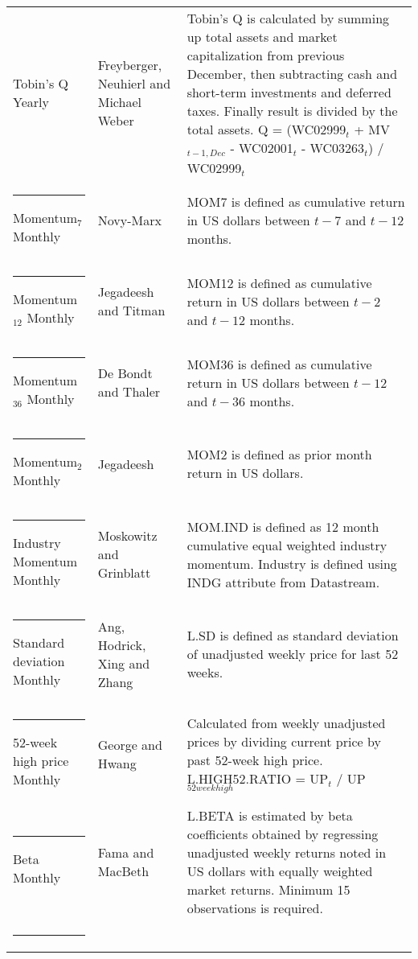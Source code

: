 \documentclass{article}
\begin{document}
{{\begin{xltabular}{\textwidth}{ >{\raggedright\arraybackslash}p{0.23\textwidth} >{\raggedright\arraybackslash}p{0.2\textwidth} X}
Tobin's Q 	\newline Yearly			& Freyberger, Neuhierl and Michael Weber \citeyear{	Freyberger2020} & Tobin's Q is calculated by summing up total assets and market capitalization from previous December, then subtracting cash and short-term investments and deferred taxes. Finally result is divided by the total assets. \newline Q = (WC02999$_{t}$ + MV$_{t-1, Dec}$ - WC02001$_{t}$ - WC03263$_{t}$) / WC02999$_{t}$ \\ \rule{-1ex}{3ex}
Momentum$_{7}$ \newline Monthly	& Novy-Marx \citeyear{NOVYMARX2012}			& MOM7 is defined as cumulative return in US dollars between $t-7$ and $t-12$ months.\\ \rule{-1ex}{3ex}
Momentum$_{12}$ \newline Monthly	& Jegadeesh and Titman \citeyear{Jegadeesh1993}	& MOM12 is defined as cumulative return in US dollars between $t-2$ and $t-12$ months.\\ \rule{-1ex}{3ex}
Momentum$_{36}$ \newline Monthly	& De Bondt and Thaler \citeyear{DeBondt1985}		& MOM36 is defined as cumulative return in US dollars between $t-12$ and $t-36$ months.\\ \rule{-1ex}{3ex}
Momentum$_{2}$ \newline Monthly	& Jegadeesh \citeyear{Jegadeesh1990}			& MOM2 is defined as prior month return in US dollars.\\ \rule{-1ex}{3ex}
Industry Momentum \newline Monthly & Moskowitz and Grinblatt \citeyear{Moskowitz1999}	 & MOM.IND is defined as 12 month cumulative equal weighted industry momentum. Industry is defined using INDG attribute from Datastream. \\ \rule{-1ex}{3ex}
Standard deviation \newline Monthly	& Ang, Hodrick, Xing and Zhang \citeyear{ang2006}	& L.SD is defined as standard deviation of unadjusted weekly price for last 52 weeks. \\ \rule{-1ex}{3ex}
52-week high price \newline Monthly	& George and Hwang \citeyear{george2004}	& Calculated from weekly unadjusted prices by dividing current price by past 52-week high price. \newline  L.HIGH52.RATIO = UP$_{t}$ / UP$_{52 week high}$\\ \rule{-1ex}{3ex}
Beta	 \newline Monthly			& Fama and MacBeth \citeyear{FamaMacBeth1973}	& L.BETA is estimated by beta coefficients obtained by regressing unadjusted weekly returns noted in US dollars with equally weighted market returns. Minimum 15 observations is required.\\ \rule{-1ex}{3ex}

\end{xltabular}}}
\end{document}
